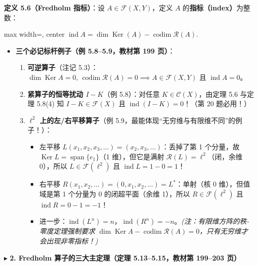 \documentclass[11pt,a4paper]{article}
\providecommand{\tightlist}{\setlength{\itemsep}{1.8pt}\setlength{\parskip}{0pt}}
\newcommand{\SubSubHeading}[1]{%
  \Needspace{6.5\baselineskip}\vspace{5.5pt}\noindent
  \textcolor{AccentMain}{\scriptsize$\blacktriangleright$}\hspace{4pt}%
  {\small\bfseries\color{AccentMain}#1}\par\nopagebreak[4]\vspace{2.5pt}%
}
\renewenvironment{quote}{%
  \begin{tcolorbox}[
    enhanced,
    breakable,
    colback=AccentSoft!48!white,
    colframe=AccentMain,
    boxrule=0pt,
    leftrule=2.8pt,
    arc=2.5pt,
    left=9pt, right=8pt, top=6pt, bottom=6pt,
    before skip=5.5pt, after skip=5.5pt
  ]\small
}{%
  \end{tcolorbox}%
}
\newcommand{\FitDisplayMath}[1]{%
  \par\vspace{4pt}\noindent
  \begin{adjustbox}{max width=\linewidth, center}
    $\displaystyle #1$
  \end{adjustbox}
  \par\vspace{4pt}%
}
\begin{document}
\begin{quote}
\textbf{定义 5.6（Fredholm 指标）}：设 \(A \in \mathcal{F}(X, Y)\)，定义 \(A\) 的\textbf{指标（index）}为整数： 
\FitDisplayMath{\operatorname{ind} A = \dim \operatorname{Ker}(A) - \operatorname{codim} \mathcal{R}(A).}

\end{quote}

\begin{itemize}
\tightlist
\item
  \textbf{三个必记标杆例子（例 5.8--5.9，教材第 199 页）}：

  \begin{enumerate}
  \def\labelenumi{\arabic{enumi}.}
  \tightlist
  \item
    \textbf{可逆算子}（注记 5.3）：\(\dim \operatorname{Ker} A = 0, \, \operatorname{codim} \mathcal{R}(A) = 0 \implies A \in \mathcal{F}(X, Y)\) 且 \(\operatorname{ind} A = 0\)。
  \item
    \textbf{紧算子的恒等扰动 \(I - K\)}（例 5.8）：对任意 \(K \in \mathcal{C}(X)\)，由定理 5.6 与定理 5.8(4) 知 \(I - K \in \mathcal{F}(X)\) 且 \textbf{\(\operatorname{ind}(I - K) = 0\)}！（第 20 题必用！）
  \item
    \textbf{\(\ell^2\) 上的左/右平移算子}（例 5.9，最能体现``无穷维与有限维不同''的例子！）：

    \begin{itemize}
    \tightlist
    \item
      左平移 \(L(x_1, x_2, x_3, \dots) = (x_2, x_3, \dots)\)：丢掉了第 1 个分量，故 \(\operatorname{Ker} L = \operatorname{span}\{e_1\}\)（1 维），但它是满射 \(\mathcal{R}(L) = \ell^2\)（闭，余维 0），所以 \(L \in \mathcal{F}(\ell^2)\) 且 \textbf{\(\operatorname{ind} L = 1 - 0 = 1\)}！
    \item
      右平移 \(R(x_1, x_2, \dots) = (0, x_1, x_2, \dots) = L^*\)：单射（核 0 维），但值域是第 1 个分量为 0 的闭超平面（余维 1），所以 \(R \in \mathcal{F}(\ell^2)\) 且 \textbf{\(\operatorname{ind} R = 0 - 1 = -1\)}！
    \item
      进一步：\(\operatorname{ind}(L^n) = n\)，\(\operatorname{ind}(R^n) = -n\)。\emph{(注：有限维方阵的秩-零度定理强制要求 \(\dim \operatorname{Ker} A - \operatorname{codim} \mathcal{R}(A) = 0\)，只有无穷维才会出现非零指标！)}
    \end{itemize}
  \end{enumerate}
\end{itemize}

\SubSubHeading{2. Fredholm 算子的三大主定理（定理 5.13--5.15，教材第 199--203 页）}
\end{document}
